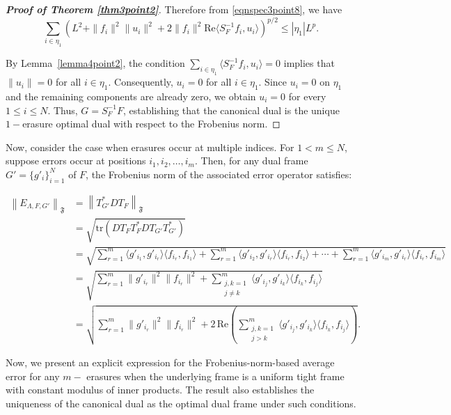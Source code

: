 \documentclass[final,1p,times]{elsarticle}
\begin{document}
\begin{proof}[\textbf{Proof of Theorem \ref{thm3point2}}]
Therefore from \eqref{eqnspec3point8}, we have
\[
\sum_{i \in \eta_1} \left( L^2 + \|f_i\|^2 \|u_i\|^2 + 2 \|f_i\|^2 \mathrm{Re} \langle S_F^{-1} f_i, u_i \rangle \right)^{p/2} \leq |\eta_1| L^p.
\]

By Lemma~\ref{lemma4point2}, the condition $\sum_{i \in \eta_1} \langle S_F^{-1} f_i, u_i \rangle = 0$ implies that \( \|u_i\| = 0 \) for all \( i \in \eta_1 \). Consequently, \( u_i = 0 \) for all \( i \in \eta_1 \). Since \( u_i = 0 \) on \( \eta_1 \) and the remaining components are already zero, we obtain \( u_i = 0 \) for every \( 1 \leq i \leq N \). Thus, \( G = S_F^{-1} F \), establishing that the canonical dual is the unique \(1-\)erasure optimal dual with respect to the Frobenius norm.

\end{proof}


      
Now, consider the case when erasures occur at multiple indices. For \( 1 < m \leq N \), suppose errors occur at positions \( i_1, i_2, \dots, i_m \). Then, for any dual frame \( G' = \{g'_i\}_{i=1}^N \) of \( F \), the Frobenius norm of the associated error operator satisfies:


\begin{align} \label{eqn4point8}
\left\|E_{\Lambda, F, G'}\right\|_{\mathfrak{F}} 
&= \left\|T_{G'}^* D T_F\right\|_{\mathfrak{F}} \nonumber \\
&= \sqrt{\mathrm{tr}\left(D T_F T_F^* D T_{G'} T_{G'}^*\right)} \nonumber \\
&= \sqrt{ \sum_{r=1}^m \langle g'_{i_1}, g'_{i_r} \rangle \langle f_{i_r}, f_{i_1} \rangle 
      + \sum_{r=1}^m \langle g'_{i_2}, g'_{i_r} \rangle \langle f_{i_r}, f_{i_2} \rangle 
      + \cdots 
      + \sum_{r=1}^m \langle g'_{i_m}, g'_{i_r} \rangle \langle f_{i_r}, f_{i_m} \rangle } \nonumber \\
&= \sqrt{ \sum_{r=1}^m \|g'_{i_r}\|^2 \|f_{i_r}\|^2 
      + \sum_{\substack{j,k=1 \\ j \neq k}}^m \langle g'_{i_j}, g'_{i_k} \rangle \langle f_{i_k}, f_{i_j} \rangle } \nonumber \\
&= \sqrt{ \sum_{r=1}^m \|g'_{i_r}\|^2 \|f_{i_r}\|^2 
      + 2\, \mathrm{Re} \left( \sum_{\substack{j,k=1 \\ j > k}}^m \langle g'_{i_j}, g'_{i_k} \rangle \langle f_{i_k}, f_{i_j} \rangle \right) }.
\end{align}


  Now, we present an explicit expression for the Frobenius-norm-based average error for any $m-$ erasures when the underlying frame is a uniform tight frame with constant modulus of inner products. The result also establishes the uniqueness of the canonical dual as the optimal dual frame under such conditions. 
   
\end{document}
